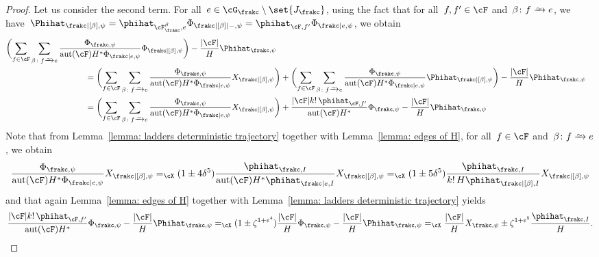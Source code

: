 \documentclass[11pt]{amsart}
\newcommand{\eps}{\varepsilon}
\DeclarePairedDelimiter{\paren}{\lparen}{\rparen}
\DeclarePairedDelimiter{\abs}{\lvert}{\rvert}
\newcommand{\Xeq}{=_{\cX}}
\newcommand{\bijection}{\mathchoice
	{\xrightarrow{\smash{\raisebox{-3pt}{$\scriptstyle\sim$}}}}%
	{\xrightarrow{\smash{\raisebox{-3pt}{$\scriptstyle\sim$}}}}%
	{\xrightarrow{\smash{\raisebox{-2.5pt}{$\scriptscriptstyle\sim$}}}}%
	{\xrightarrow{\smash{\raisebox{-2.5pt}{$\scriptscriptstyle\sim$}}}}%
}
\DeclareMathOperator{\aut}{aut}
\theoremstyle{definition}
\numberwithin{equation}{section}
\begin{document}
\begin{proof}
		Let us consider the second term.
		For all~$e\in\cG_\frakc\setminus\set{J_\frakc}$, using the fact that for all~$f,f'\in\cF$ and~$\beta\colon f\bijection e$, we have~$\Phihat_{\frakc|[\beta],\psi}=\phihat_{\cF_\frakc^\beta,e}\Phi_{\frakc|[\beta]|-,\psi}=\phihat_{\cF,f'}\Phi_{\frakc|e,\psi}$, we obtain 
		\begin{equation}\label{equation: second term base}
			\begin{aligned}
				\paren[\bigg]{\sum_{f\in\cF}\sum_{\beta\colon f\bijection e}\frac{\Phi_{\frakc,\psi}}{\aut(\cF)H^*\Phi_{\frakc|e,\psi}}\Phi_{\frakc|[\beta],\psi}}-\frac{\abs{\cF}}{H}\Phihat_{\frakc,\psi}\hspace{-8cm}\\
				&=\paren[\bigg]{\sum_{f\in\cF}\sum_{\beta\colon f\bijection e}\frac{\Phi_{\frakc,\psi}}{\aut(\cF)H^*\Phi_{\frakc|e,\psi}}X_{\frakc|[\beta],\psi}}+\paren[\bigg]{\sum_{f\in\cF}\sum_{\beta\colon f\bijection e}\frac{\Phi_{\frakc,\psi}}{\aut(\cF)H^*\Phi_{\frakc|e,\psi}}\Phihat_{\frakc|[\beta],\psi}}-\frac{\abs{\cF}}{H}\Phihat_{\frakc,\psi}\\
				&=\paren[\bigg]{\sum_{f\in\cF}\sum_{\beta\colon f\bijection e}\frac{\Phi_{\frakc,\psi}}{\aut(\cF)H^*\Phi_{\frakc|e,\psi}}X_{\frakc|[\beta],\psi}}+\frac{\abs{\cF}k!\,\phihat_{\cF,f'}}{\aut(\cF)H^*}\Phi_{\frakc,\psi}-\frac{\abs{\cF}}{H}\Phihat_{\frakc,\psi}
			\end{aligned}
		\end{equation}
		Note that from Lemma~\ref{lemma: ladders deterministic trajectory} together with Lemma~\ref{lemma: edges of H}, for all~$f\in\cF$ and~$\beta\colon f\bijection e$, we obtain
		\begin{equation}\label{equation: second term step one}
			\frac{\Phi_{\frakc,\psi}}{\aut(\cF)H^*\Phi_{\frakc|e,\psi}}X_{\frakc|[\beta],\psi}
			\Xeq (1\pm 4\delta^5)\frac{\phihat_{\frakc,I}}{\aut(\cF)H^*\phihat_{\frakc|e,I}}X_{\frakc|[\beta],\psi}
			\Xeq (1\pm 5\delta^5)\frac{\phihat_{\frakc,I}}{k!\,H\phihat_{\frakc|[\beta],I}}X_{\frakc|[\beta],\psi}
		\end{equation}
		and that again Lemma~\ref{lemma: edges of H} together with Lemma~\ref{lemma: ladders deterministic trajectory} yields
		\begin{equation}\label{equation: second term step two}
			\frac{\abs{\cF}k!\,\phihat_{\cF,f'}}{\aut(\cF)H^*}\Phi_{\frakc,\psi}-\frac{\abs{\cF}}{H}\Phihat_{\frakc,\psi}
			\Xeq (1\pm\zeta^{1+\eps^4})\frac{\abs{\cF}}{H}\Phi_{\frakc,\psi}-\frac{\abs{\cF}}{H}\Phihat_{\frakc,\psi}
			\Xeq \frac{\abs{\cF}}{H}X_{\frakc,\psi}\pm\zeta^{1+\eps^5}\frac{\phihat_{\frakc,I}}{H}.

\end{equation}
\end{proof}
\end{document}
